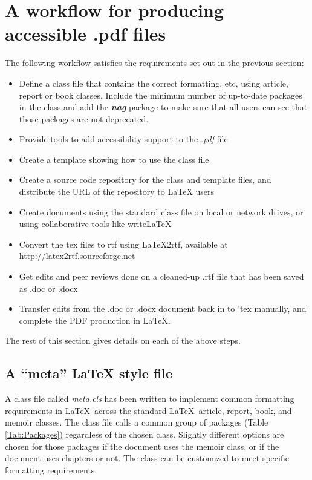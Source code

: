 \documentclass[12pt,letterpaper]{article}
\newcommand{\fn}[1]{\emph{#1}}
\newcommand{\packagename}[1]{\textbf{\emph{#1}}}
\begin{document}
\section{A workflow for producing accessible .pdf files}
The following workflow satisfies the requirements set out in the previous section:
\begin{itemize}
\item Define a class file that contains the correct formatting, etc, using article, report or book classes. Include the minimum number of up-to-date packages in the class and add the \packagename{nag} package to make sure that all users can see that those packages are not deprecated.
\item Provide tools to add accessibility support to the \fn{.pdf} file
\item Create a template showing how to use the class file
\item Create a source code repository for the class and template files, and distribute the URL of the repository to LaTeX users
\item Create documents using the standard class file on local or network drives, or using collaborative tools like writeLaTeX
\item Convert the tex files to rtf using LaTeX2rtf, available at http://latex2rtf.sourceforge.net
\item Get edits and peer reviews done on a cleaned-up .rtf file that has been saved as .doc or .docx
\item Transfer edits from the .doc or .docx document back in to 'tex manually, and complete the PDF production in LaTeX.
\end{itemize}

The rest of this section gives details on each of the above steps.

\subsection{A ``meta'' LaTeX style file}\label{sec:meta.cls}
A class file called \fn{meta.cls} has been written to implement common formatting requirements in \LaTeX\ across the standard \LaTeX\ article, report, book, and memoir classes. The class file calls a common group of packages (Table \ref{Tab:Packages}) regardless of the chosen class. Slightly different options are chosen for those packages if the document uses the memoir class, or if the document uses chapters or not. The class can be customized to meet specific formatting requirements. 
\end{document}
